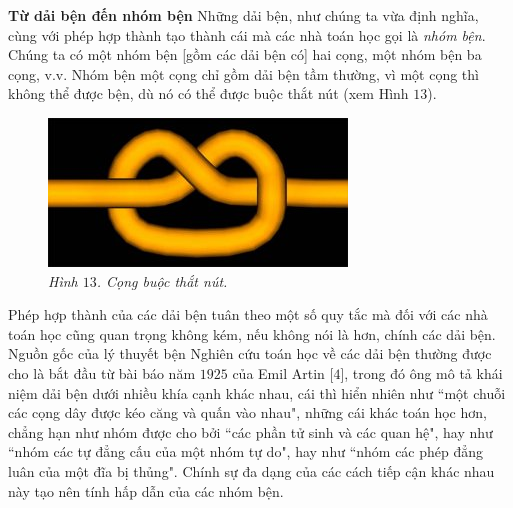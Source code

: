 \begin{multicols}{2}
	\textbf{\color{duongvaotoanhoc}Từ dải bện đến nhóm bện}
	\vskip 0.1cm
	Những dải bện, như chúng ta vừa định nghĩa, cùng với phép hợp thành tạo thành cái mà các nhà toán học gọi là \textit{nhóm bện}. Chúng ta có một nhóm bện [gồm các dải bện có] hai cọng, một nhóm bện ba cọng, v.v. Nhóm bện một cọng chỉ gồm dải bện tầm thường, vì một cọng thì không thể được bện, dù nó có thể được buộc thắt nút (xem Hình $13$).
	\begin{figure}[H]
		\vspace*{-5pt}
		\centering
		\captionsetup{labelformat= empty, justification=centering}
		\includegraphics[width= 0.5\linewidth]{fig_13}
		\caption{\small\textit{\color{duongvaotoanhoc}Hình $13$. Cọng buộc thắt nút.}}
		\vspace*{-10pt}
	\end{figure}
	Phép hợp thành của các dải bện tuân theo một số quy tắc mà đối với các nhà toán học cũng quan trọng không kém, nếu không nói là hơn, chính các dải bện.
	Nguồn gốc của lý thuyết bện
	\vskip 0.1cm
	Nghiên cứu toán học về các dải bện thường được cho là bắt đầu từ bài báo năm $1925$ của Emil Artin [$4$], trong đó ông mô tả khái niệm dải bện dưới nhiều khía cạnh khác nhau, cái thì hiển nhiên như ``một chuỗi các cọng dây được kéo căng và quấn vào nhau", những cái khác toán học hơn, chẳng hạn như nhóm được cho bởi ``các phần tử sinh và các quan hệ", hay như ``nhóm các tự đẳng cấu của một nhóm tự do", hay như  ``nhóm các phép đẳng luân của một đĩa bị thủng". Chính sự đa dạng của các cách tiếp cận khác nhau này tạo nên tính hấp dẫn của các nhóm bện.
	\begin{tBox}
		\begin{figure}
			\vspace*{-15pt}
			\centering
			\captionsetup{labelformat= empty, justification=centering}

\end{figure}
\end{tBox}
\end{multicols}
